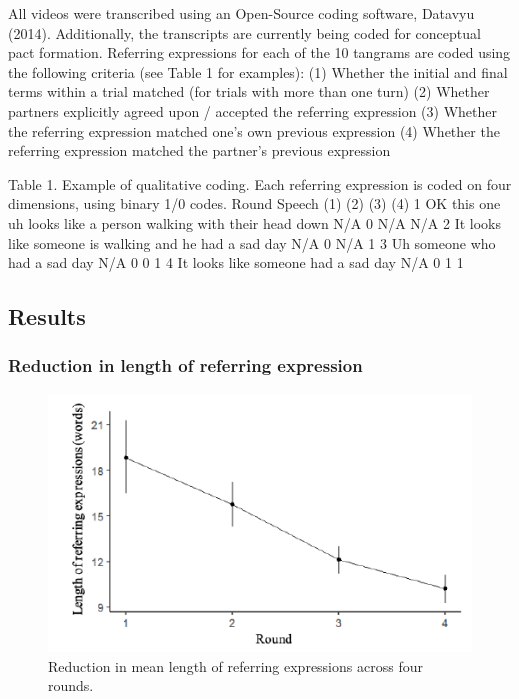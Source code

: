 \documentclass[10pt, letterpaper]{article}
\newenvironment{CodeChunk}{}{}
\begin{document}
All videos were transcribed using an Open-Source coding software,
Datavyu (2014). Additionally, the transcripts are currently being coded
for conceptual pact formation. Referring expressions for each of the 10
tangrams are coded using the following criteria (see Table 1 for
examples): (1) Whether the initial and final terms within a trial
matched (for trials with more than one turn) (2) Whether partners
explicitly agreed upon / accepted the referring expression (3) Whether
the referring expression matched one's own previous expression (4)
Whether the referring expression matched the partner's previous
expression

Table 1. Example of qualitative coding. Each referring expression is
coded on four dimensions, using binary 1/0 codes. Round Speech (1) (2)
(3) (4) 1 OK this one uh looks like a person walking with their head
down N/A 0 N/A N/A 2 It looks like someone is walking and he had a sad
day N/A 0 N/A 1 3 Uh someone who had a sad day N/A 0 0 1 4 It looks like
someone had a sad day N/A 0 1 1

\hypertarget{results}{%
\subsection{Results}\label{results}}

\hypertarget{reduction-in-length-of-referring-expression}{%
\subsubsection{Reduction in length of referring
expression}\label{reduction-in-length-of-referring-expression}}

\begin{CodeChunk}
\begin{figure}[b]

{\centering \includegraphics{figs/reduction-1} 

}

\caption[Reduction in mean length of referring expressions across four rounds]{Reduction in mean length of referring expressions across four rounds.}\label{fig:reduction}
\end{figure}
\end{CodeChunk}
\end{document}
